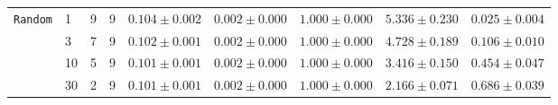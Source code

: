 \begin{table*}[htbp]
\begin{tabular}{l l c c c c c c c}
    \midrule
    \multirow{4}{*}{\texttt{Random}} & 1 & 9 & 9 & $0.104\pm0.002$ & $0.002\pm0.000$ & $1.000\pm0.000$ & $5.336\pm0.230$ & $\mathbf{0.025}\pm0.004$ \\
                                     & 3 & 7 & 9 & $0.102\pm0.001$ & $0.002\pm0.000$ & $1.000\pm0.000$ & $4.728\pm0.189$ & $0.106\pm0.010$ \\
                                     & 10 & 5 & 9 & $\mathbf{0.101}\pm0.001$ & $\mathbf{0.002}\pm0.000$ & $\mathbf{1.000}\pm0.000$ & $3.416\pm0.150$ & $0.454\pm0.047$ \\
                                     & 30 & 2 & 9 & $0.101\pm0.001$ & $0.002\pm0.000$ & $1.000\pm0.000$ & $\mathbf{2.166}\pm0.071$ & $0.686\pm0.039$ \\
    \bottomrule
  \end{tabular}
\end{table*}
